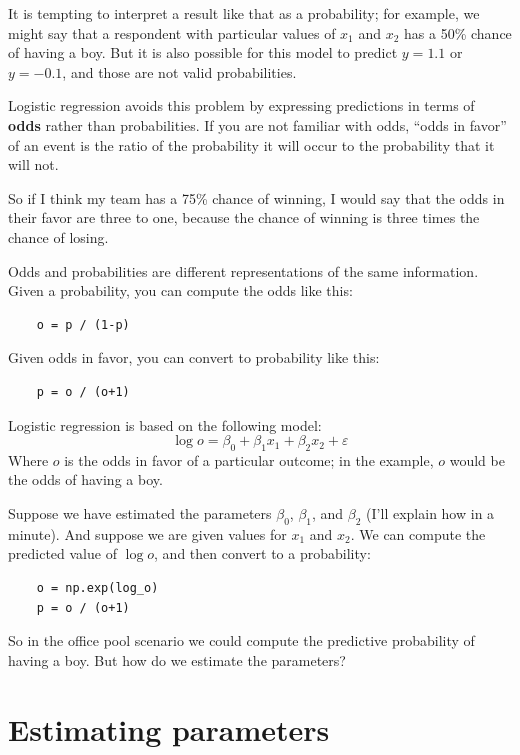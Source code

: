 \documentclass[12pt]{book}
\newcommand{\eps}{\varepsilon}
\theoremstyle{exercise}
\begin{document}
It is tempting to interpret a result like that as a probability; for
example, we might say that a respondent with particular values of
$x_1$ and $x_2$ has a 50\% chance of having a boy.  But it is also
possible for this model to predict $y=1.1$ or $y=-0.1$, and those
are not valid probabilities.%

Logistic regression avoids this problem by expressing predictions in
terms of {\bf odds} rather than probabilities.  If you are not
familiar with odds, ``odds in favor'' of an event is the ratio of the
probability it will occur to the probability that it will not.%

So if I think my team has a 75\% chance of winning, I would
say that the odds in their favor are three to one, because
the chance of winning is three times the chance of losing.

Odds and probabilities are different representations of the same
information.  Given a probability, you can compute the odds like this:

\begin{verbatim}
    o = p / (1-p)
\end{verbatim}

Given odds in favor, you can convert to
probability like this:

\begin{verbatim}
    p = o / (o+1)
\end{verbatim}

Logistic regression is based on the following model:
%
\[ \log o = \beta_0 + \beta_1 x_1 + \beta_2 x_2 + \eps \]
%
Where $o$ is the odds in favor of a particular outcome; in the
example, $o$ would be the odds of having a boy.%

Suppose we have estimated the parameters $\beta_0$, $\beta_1$, and
$\beta_2$ (I'll explain how in a minute).  And suppose we are given
values for $x_1$ and $x_2$.  We can compute the predicted value of
$\log o$, and then convert to a probability:

\begin{verbatim}
    o = np.exp(log_o)
    p = o / (o+1)
\end{verbatim}

So in the office pool scenario we could compute the predictive
probability of having a boy.  But how do we estimate the parameters?%


\section{Estimating parameters}
\end{document}

